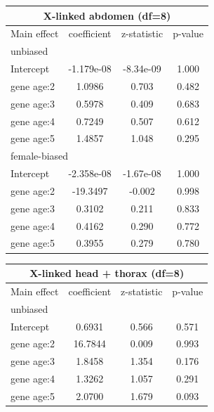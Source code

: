 \documentclass{article}
\begin{document}
\begin{table}[H]
    \begin{tabular}{l |c  |c| c}
        \multicolumn{4}{c}{X-linked abdomen (df=8)}\\
        \hline
        Main effect & coefficient & z-statistic & p-value \\
        \hline
        \hline
        \multicolumn{4}{l}{unbiased}\\
        \hline
        Intercept &-1.179e-08 &-8.34e-09 & 1.000 \\
        \hline
        gene age:2 &     1.0986 &     0.703 & 0.482 \\
        \hline
        gene age:3 &     0.5978 &     0.409 & 0.683 \\
        \hline
        gene age:4 &     0.7249 &     0.507 & 0.612 \\
        \hline
        gene age:5 &     1.4857 &     1.048 & 0.295 \\
        \hline
        \hline
        \multicolumn{4}{l}{female-biased}\\
        \hline
        Intercept &-2.358e-08   & -1.67e-08 & 1.000 \\
        \hline
        gene age:2 &    -19.3497   &    -0.002 & 0.998 \\
        \hline
        gene age:3 &     0.3102   &     0.211 & 0.833 \\
        \hline
        gene age:4 &     0.4162   &     0.290 & 0.772 \\
        \hline
        gene age:5 &     0.3955   &     0.279 & 0.780 \\
        \hline
    \end{tabular}
    \hspace{0.5cm}
    \begin{tabular}{l |c | c| c}
        \multicolumn{4}{c}{X-linked head + thorax (df=8)}\\
        \hline
        Main effect & coefficient & z-statistic & p-value \\
        \hline
        \hline
        \multicolumn{4}{l}{unbiased}\\
        \hline
        Intercept &  0.6931 &     0.566 & 0.571 \\
        \hline
        gene age:2 &  16.7844 &     0.009 & 0.993 \\
        \hline
        gene age:3 &  1.8458 &     1.354 & 0.176 \\
        \hline
        gene age:4 &  1.3262 &     1.057 & 0.291 \\
        \hline
        gene age:5 &  2.0700 &     1.679 & 0.093 \\

\end{tabular}
\end{table}
\end{document}
